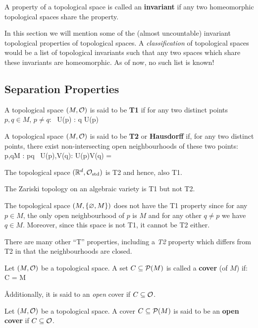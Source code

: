 A property of a topological space is called an \textbf{invariant} if any two homeomorphic topological spaces share
the property.
\ed

In this section we will mention some of the (almost uncountable) invariant topological properties of topological
spaces. A \emph{classification} of topological spaces would be a list of topological invariants such that any two
spaces which share these invariants are homeomorphic. As of now, no such list is known!

\subsection{Separation Properties}

A topological space $(M,\mathcal{O})$ is said to be \textbf{T1} if for any two distinct points $p,q\in M$, $p\neq q$:
\bse
\exists \, U(p) \in \cO : q \notin U(p)
\ese
\ed

A topological space $(M,\mathcal{O})$ is said to be \textbf{T2} or \textbf{Hausdorff} if, for any two distinct points, there
exist non-intersecting open neighbourhoods of these two points:
\bse
\forall \, p,q\in M : p\neq q \imp \exists \, U(p),V(q)\in \cO : U(p)\cap V(q) = \vn
\ese
\ed

\be
The topological space $(\mathbb{R}^d,\mathcal{O}_\mathrm{std})$ is T2 and hence, also T1.
\ee

\be
The Zariski topology on an algebraic variety is T1 but not T2.
\ee

\be
The topological space $(M,\{\varnothing,M\})$ does not have the T1 property since for any $p \in M$, the only open
neighbourhood of $p$ is $M$ and for any other $q\neq p$ we have $q\in M$. Moreover, since this space is not T1, it
cannot be T2 either.
\ee

There are many other ``T'' properties, including a \emph{T2} property which differs from T2 in that the
neighbourhoods are closed.

\bd [Cover]
Let $(M,\mathcal{O})$ be a topological space. A set $C \subseteq \mathcal{P}(M)$ is called a \textbf{cover} (of $M$) if:
\bse
\bigcup C = M
\ese

\v

Additionally, it is said to an \emph{open} cover if $C \subseteq \mathcal{O}$.
\ed

Let $(M,\mathcal{O})$ be a topological space. A cover $C \subseteq \mathcal{P}(M)$ is said to be an \textbf{open cover} if $C \subseteq \mathcal{O}$.
\ed

